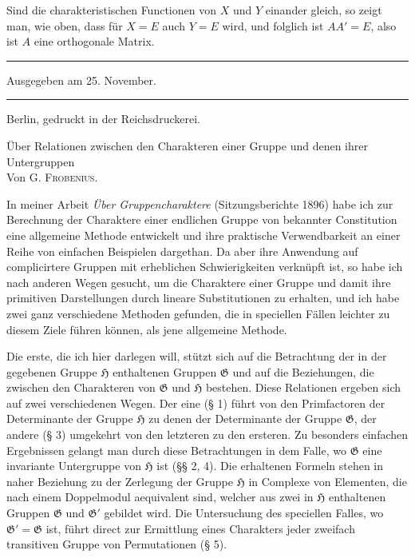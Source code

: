 \documentclass[11pt]{article}
\newcommand{\Hgr}{\mathfrak{H}}
\newcommand{\Ggr}{\mathfrak{G}}
\begin{document}
Sind die charakteristischen Functionen von $X$ und $Y$ einander gleich, so zeigt man, wie oben, dass für $X=E$ auch $Y=E$ wird, und folglich ist $AA'=E$, also ist $A$ eine orthogonale Matrix.

\begin{center}
\rule{40mm}{0.4pt}

Ausgegeben am 25. November.

\rule{40mm}{0.4pt}
\end{center}

\begin{flushright}
Berlin, gedruckt in der Reichsdruckerei.
\end{flushright}

\clearpage

\begin{center}
{\Large Über Relationen zwischen den Charakteren einer Gruppe und denen ihrer Untergruppen}\\[0.75em]
Von G. \textsc{Frobenius}.
\end{center}

In meiner Arbeit \emph{Über Gruppencharaktere} (Sitzungsberichte 1896) habe ich zur Berechnung der Charaktere einer endlichen Gruppe von bekannter Constitution eine allgemeine Methode entwickelt und ihre praktische Verwendbarkeit an einer Reihe von einfachen Beispielen dargethan. Da aber ihre Anwendung auf complicirtere Gruppen mit erheblichen Schwierigkeiten verknüpft ist, so habe ich nach anderen Wegen gesucht, um die Charaktere einer Gruppe und damit ihre primitiven Darstellungen durch lineare Substitutionen zu erhalten, und ich habe zwei ganz verschiedene Methoden gefunden, die in speciellen Fällen leichter zu diesem Ziele führen können, als jene allgemeine Methode.

Die erste, die ich hier darlegen will, stützt sich auf die Betrachtung der in der gegebenen Gruppe $\Hgr$ enthaltenen Gruppen $\Ggr$ und auf die Beziehungen, die zwischen den Charakteren von $\Ggr$ und $\Hgr$ bestehen. Diese Relationen ergeben sich auf zwei verschiedenen Wegen. Der eine (§ 1) führt von den Primfactoren der Determinante der Gruppe $\Hgr$ zu denen der Determinante der Gruppe $\Ggr$, der andere (§ 3) umgekehrt von den letzteren zu den ersteren. Zu besonders einfachen Ergebnissen gelangt man durch diese Betrachtungen in dem Falle, wo $\Ggr$ eine invariante Untergruppe von $\Hgr$ ist (§§ 2, 4). Die erhaltenen Formeln stehen in naher Beziehung zu der Zerlegung der Gruppe $\Hgr$ in Complexe von Elementen, die nach einem Doppelmodul aequivalent sind, welcher aus zwei in $\Hgr$ enthaltenen Gruppen $\Ggr$ und $\Ggr'$ gebildet wird. Die Untersuchung des speciellen Falles, wo $\Ggr'=\Ggr$ ist, führt direct zur Ermittlung eines Charakters jeder zweifach transitiven Gruppe von Permutationen (§ 5).
\end{document}
